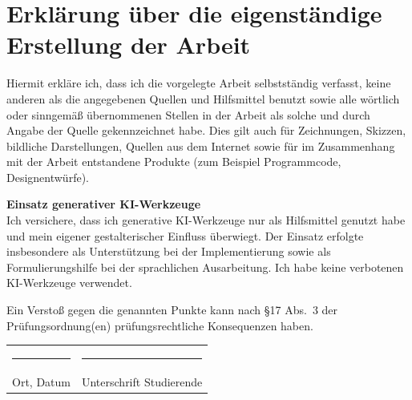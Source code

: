 \thispagestyle{empty}
\small

\section*{Erklärung über die eigenständige Erstellung der Arbeit}

Hiermit erkläre ich, dass ich die vorgelegte Arbeit selbstständig verfasst, keine anderen als die angegebenen Quellen und Hilfsmittel benutzt sowie alle wörtlich oder sinngemäß übernommenen Stellen in der Arbeit als solche und durch Angabe der Quelle gekennzeichnet habe. Dies gilt auch für Zeichnungen, Skizzen, bildliche Darstellungen, Quellen aus dem Internet sowie für im Zusammenhang mit der Arbeit entstandene Produkte (zum Beispiel Programmcode, Designentwürfe).

\vspace{1em}
\noindent\textbf{Einsatz generativer KI-Werkzeuge} \\
Ich versichere, dass ich generative KI-Werkzeuge nur als Hilfsmittel genutzt habe und mein eigener gestalterischer Einfluss überwiegt. Der Einsatz erfolgte insbesondere als Unterstützung bei der Implementierung sowie als Formulierungshilfe bei der sprachlichen Ausarbeitung. Ich habe keine verbotenen KI-Werkzeuge verwendet.

\vspace{0.5em}
Ein Verstoß gegen die genannten Punkte kann nach \S 17 Abs.~3 der Prüfungsordnung(en) prüfungs\-rechtliche Konsequenzen haben.

\vspace{1.5em}

\noindent
\begin{tabular}{p{}p{}}
    \rule{6cm}{0.4pt} & \rule{6cm}{0.4pt} \\
    Ort, Datum & Unterschrift Studierende
\end{tabular}